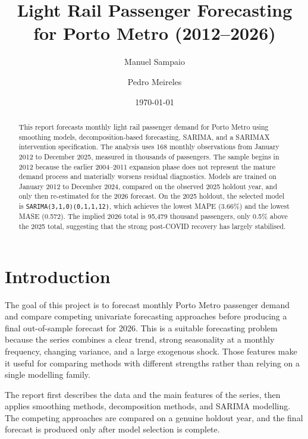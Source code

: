 \documentclass[runningheads]{llncs}
\begin{document}
\title{Light Rail Passenger Forecasting for Porto Metro (2012--2026)}
\author{Manuel Sampaio \and Pedro Meireles}
\date{\today}
\maketitle

\begin{abstract}
This report forecasts monthly light rail passenger demand for Porto Metro using smoothing models, decomposition-based forecasting, SARIMA, and a SARIMAX intervention specification. The analysis uses 168 monthly observations from January 2012 to December 2025, measured in thousands of passengers. The sample begins in 2012 because the earlier 2004--2011 expansion phase does not represent the mature demand process and materially worsens residual diagnostics. Models are trained on January 2012 to December 2024, compared on the observed 2025 holdout year, and only then re-estimated for the 2026 forecast. On the 2025 holdout, the selected model is \texttt{SARIMA(3,1,0)(0,1,1,12)}, which achieves the lowest MAPE (3.66\%) and the lowest MASE (0.572). The implied 2026 total is 95,479 thousand passengers, only 0.5\% above the 2025 total, suggesting that the strong post-COVID recovery has largely stabilised.
\end{abstract}

\section{Introduction}
The goal of this project is to forecast monthly Porto Metro passenger demand and compare competing univariate forecasting approaches before producing a final out-of-sample forecast for 2026. This is a suitable forecasting problem because the series combines a clear trend, strong seasonality at a monthly frequency, changing variance, and a large exogenous shock. Those features make it useful for comparing methods with different strengths rather than relying on a single modelling family.

The report first describes the data and the main features of the series, then applies smoothing methods, decomposition methods, and SARIMA modelling. The competing approaches are compared on a genuine holdout year, and the final forecast is produced only after model selection is complete.
\end{document}
